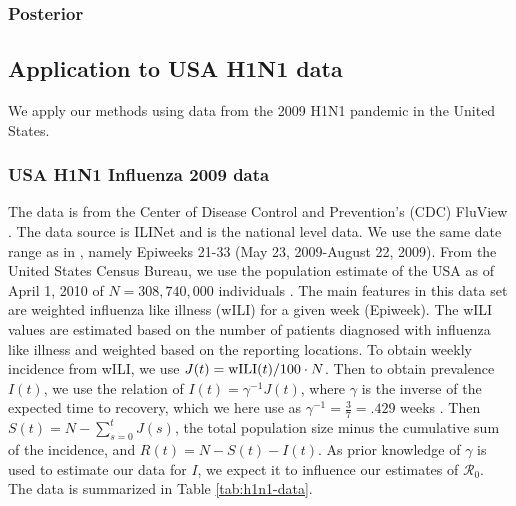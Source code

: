 \documentclass[12pt]{article}
\newcommand{\rr}{\ensuremath{\mathcal{R}_0}}
\begin{document}
      \subsubsection{Posterior}


      \subsection{Application to USA H1N1 data}\label{sec:real-data}
      We apply our methods using data from the 2009 H1N1 pandemic in the United States.

      \subsubsection{USA H1N1 Influenza 2009 data}
      The data is from the Center of Disease Control and Prevention's (CDC) FluView \citep{cdc-fluview}.  The data source is ILINet and is the national level data.  We use the same date range as in \cite{towers2009}, namely Epiweeks 21-33 (May 23, 2009-August 22, 2009).  From the United States Census Bureau, we use the population estimate of the USA as of April 1, 2010 of $N=308,740,000$ individuals \citep{census-2010}.  The main features in this data set are weighted influenza like illness (wILI) for a given week (Epiweek).  The wILI values are estimated based on the number of patients diagnosed with influenza like illness and weighted based on the reporting locations.  To obtain weekly incidence from wILI, we use $J(t) = \textnormal{wILI}(t) / 100 \cdot N$.  Then to obtain prevalence $I(t)$, we use the relation of $I(t) = \gamma^{-1}J(t)$, where $\gamma$ is the inverse of the expected time to recovery, which we here use as $\gamma^{-1} = \frac{3}{7}=.429$ weeks \citep{vespignani2007}.  Then $S(t) = N - \sum_{s=0}^{t}J(s)$, the total population size minus the cumulative sum of the incidence, and $R(t) = N - S(t) - I(t)$.  As prior knowledge of $\gamma$ is used to estimate our data for $I$, we expect it to influence our estimates of $\rr$.  The data is summarized in Table \ref{tab:h1n1-data}.
\end{document}
